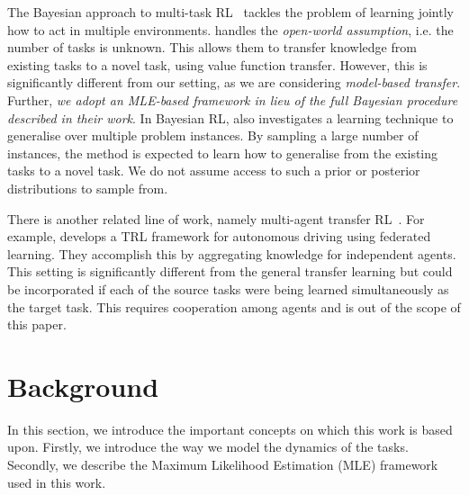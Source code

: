 The Bayesian approach to multi-task RL~\citep{wilson2007multi, lazaric2010bayesian} tackles the problem of learning jointly how to act in multiple environments. \citep{lazaric2010bayesian} handles the \emph{open-world assumption}, i.e. the number of tasks is unknown. This allows them to transfer knowledge from existing tasks to a novel task, using value function transfer. However, this is significantly different from our setting, as we are considering \emph{model-based transfer}. Further, \textit{we adopt an MLE-based framework in lieu of the full Bayesian procedure described in their work}.
In Bayesian RL, \citep{tamar2022regularization} also investigates a learning technique to generalise over multiple problem instances. By sampling a large number of instances, the method is expected to learn how to generalise from the existing tasks to a novel task. We do not assume access to such a prior or posterior distributions to sample from.

There is another related line of work, namely multi-agent transfer RL~\citep{da2019survey}. For example, \citep{liang2023federated} develops a TRL framework for autonomous driving using federated learning. They accomplish this by aggregating knowledge for independent agents. This setting is significantly different from the general transfer learning but could be incorporated if each of the source tasks were being learned simultaneously as the target task. This requires cooperation among agents and is out of the scope of this paper.

\section{Background}\label{sec:background}

In this section, we introduce the important concepts on which this work is based upon. Firstly, we introduce the way we model the dynamics of the tasks. Secondly, we describe the Maximum Likelihood Estimation (MLE) framework used in this work.

